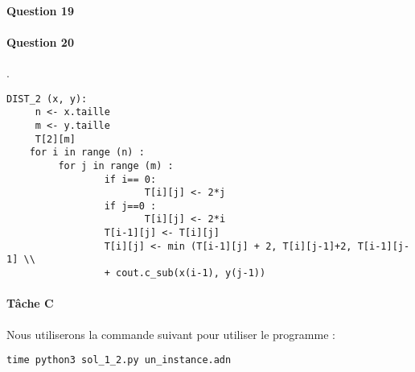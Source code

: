 \paragraph{Question 19}
\paragraph{Question 20}.\\
\begin{lstlisting}
DIST_2 (x, y):
     n <- x.taille
     m <- y.taille
     T[2][m]
    for i in range (n) :
         for j in range (m) :
                 if i== 0:
                        T[i][j] <- 2*j
                 if j==0 :
                        T[i][j] <- 2*i
                 T[i-1][j] <- T[i][j]
                 T[i][j] <- min (T[i-1][j] + 2, T[i][j-1]+2, T[i-1][j-1] \\
                 + cout.c_sub(x(i-1), y(j-1))
\end{lstlisting}
\paragraph{Tâche C}
Nous utiliserons la commande suivant pour utiliser le programme :
\begin{lstlisting}
time python3 sol_1_2.py un_instance.adn
\end{lstlisting}
